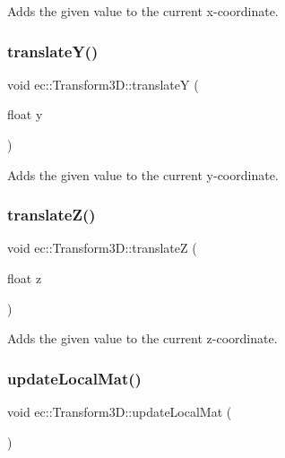 Adds the given value to the current x-\/coordinate. \mbox{\label{classec_1_1_transform3_d_ab0c9d7ff73b744c480914b7d2aaabf81}} 
\subsubsection{\texorpdfstring{translate\+Y()}{translateY()}}
{\footnotesize\ttfamily void ec\+::\+Transform3\+D\+::translateY (\begin{DoxyParamCaption}\item[{float}]{y }\end{DoxyParamCaption})}

Adds the given value to the current y-\/coordinate. \mbox{\label{classec_1_1_transform3_d_a13ea4d1c69ec17c2ce4c1d8b4068639a}} 
\subsubsection{\texorpdfstring{translate\+Z()}{translateZ()}}
{\footnotesize\ttfamily void ec\+::\+Transform3\+D\+::translateZ (\begin{DoxyParamCaption}\item[{float}]{z }\end{DoxyParamCaption})}

Adds the given value to the current z-\/coordinate. \mbox{\label{classec_1_1_transform3_d_a68d259da063ea2aff48720ae55870445}} 
\subsubsection{\texorpdfstring{update\+Local\+Mat()}{updateLocalMat()}}
{\footnotesize\ttfamily void ec\+::\+Transform3\+D\+::update\+Local\+Mat (\begin{DoxyParamCaption}{ }\end{DoxyParamCaption})\hspace{0.3cm}{\ttfamily [virtual]}}



